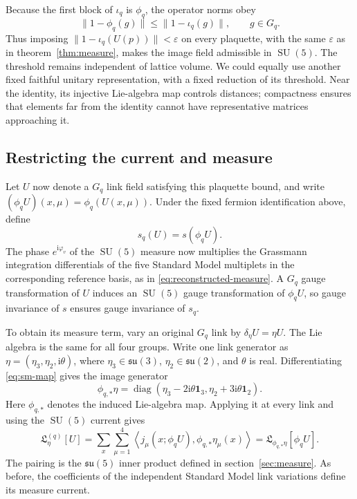 \documentclass[11pt,a4paper]{article}
\theoremstyle{remark}
\DeclareMathOperator{\SU}{SU}
\newcommand{\Id}{\mathbf 1}
\newcommand{\ii}{\mathrm i}
\newcommand{\eps}{\varepsilon}
\begin{document}
Because the first block of $\iota_q$ is $\phi_q$, the operator norms obey
\begin{equation}
 \|1-\phi_q(g)\|\le\|1-\iota_q(g)\|,\qquad g\in G_q .
\end{equation}
Thus imposing $\|1-\iota_q(U(p))\|<\eps$ on every plaquette,
with the same $\eps$ as in theorem~\ref{thm:measure}, makes the image
field admissible in $\SU(5)$. The threshold remains independent of
lattice volume. We could equally use another fixed faithful unitary
representation, with a fixed reduction of its threshold. Near the
identity, its injective Lie-algebra map controls distances; compactness
ensures that elements far from the identity cannot have representative
matrices approaching it.


\subsection{Restricting the current and measure}

Let $U$ now denote a $G_q$ link field satisfying this plaquette bound,
and write $(\phi_qU)(x,\mu)=\phi_q(U(x,\mu))$. Under the fixed
fermion identification above, define
\begin{equation}
 s_q(U)=s(\phi_qU).
\end{equation}
The phase $e^{\ii\varphi_v}$ of the $\SU(5)$ measure now multiplies
the Grassmann integration differentials of the five Standard Model
multiplets in the corresponding reference basis, as in
\eqref{eq:reconstructed-measure}. A $G_q$ gauge transformation of $U$
induces an $\SU(5)$ gauge transformation of $\phi_qU$, so gauge
invariance of $s$ ensures gauge invariance of $s_q$.

To obtain its measure term, vary an original $G_q$ link by
$\delta_\eta U=\eta U$. The Lie algebra is the same for all four
groups. Write one link generator as
$\eta=(\eta_3,\eta_2,\ii\theta)$, where
$\eta_3\in\mathfrak{su}(3)$, $\eta_2\in\mathfrak{su}(2)$, and
$\theta$ is real. Differentiating \eqref{eq:sm-map} gives the image
generator
\begin{equation}
 \phi_{q,*}\eta
   =\operatorname{diag}(\eta_3-2\ii\theta\Id_3,
                        \eta_2+3\ii\theta\Id_2).
\end{equation}
Here $\phi_{q,*}$ denotes the induced Lie-algebra map. Applying it
at every link and using the $\SU(5)$ current gives
\begin{equation}
 \mathfrak L^{(q)}_\eta[U]
 =\sum_x\sum_{\mu=1}^4
       \left\langle j_\mu(x;\phi_qU),
                    \phi_{q,*}\eta_\mu(x)\right\rangle
 =\mathfrak L_{\phi_{q,*}\eta}[\phi_qU].
\end{equation}
The pairing is the $\mathfrak{su}(5)$ inner product defined in
section~\ref{sec:measure}. As before, the coefficients of the independent
Standard Model link variations define its measure current.
\end{document}
